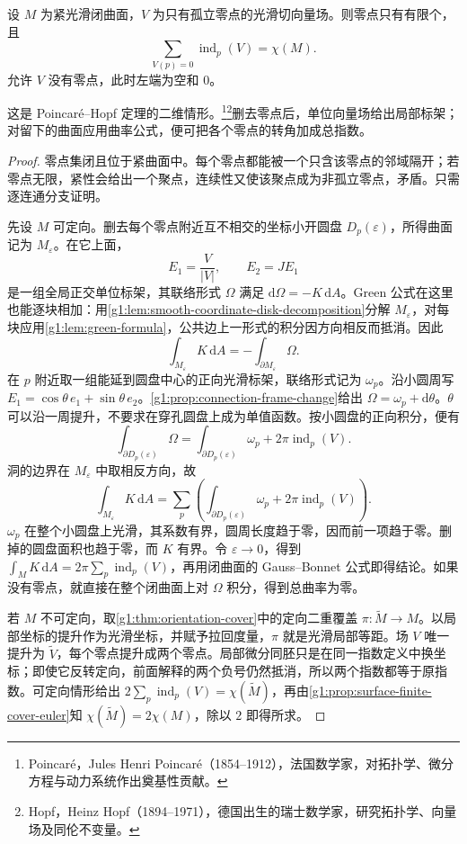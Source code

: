 \begin{theorem}
	\label{g1:thm:surface-poincare-hopf}
	设 \(M\) 为紧光滑闭曲面，\(V\) 为只有孤立零点的光滑切向量场。则零点只有有限个，且
	\begin{equation}
		\label{g1:eq:surface-index-sum}
		\sum_{V(p)=0}\operatorname{ind}_p(V)=\chi(M).
	\end{equation}
	允许 \(V\) 没有零点，此时左端为空和 \(0\)。
\end{theorem}

这是 Poincar\'e--Hopf 定理的二维情形。\footnote{Poincar\'e，Jules Henri Poincar\'e（1854--1912），法国数学家，对拓扑学、微分方程与动力系统作出奠基性贡献。}\footnote{Hopf，Heinz Hopf（1894--1971），德国出生的瑞士数学家，研究拓扑学、向量场及同伦不变量。}删去零点后，单位向量场给出局部标架；对留下的曲面应用曲率公式，便可把各个零点的转角加成总指数。
\begin{proof}
	零点集闭且位于紧曲面中。每个零点都能被一个只含该零点的邻域隔开；若零点无限，紧性会给出一个聚点，连续性又使该聚点成为非孤立零点，矛盾。只需逐连通分支证明。

	先设 \(M\) 可定向。删去每个零点附近互不相交的坐标小开圆盘 \(D_p(\varepsilon)\)，所得曲面记为 \(M_\varepsilon\)。在它上面，
	\[
		E_1=\frac{V}{|V|},\qquad E_2=JE_1
	\]
	是一组全局正交单位标架，其联络形式 \(\Omega\) 满足 \(\mathrm{d}\Omega=-K\,\mathrm{d}A\)。Green 公式在这里也能逐块相加：用\cref{g1:lem:smooth-coordinate-disk-decomposition}分解 \(M_\varepsilon\)，对每块应用\cref{g1:lem:green-formula}，公共边上一形式的积分因方向相反而抵消。因此
	\[
		\int_{M_\varepsilon}K\,\mathrm{d}A=-\int_{\partial M_\varepsilon}\Omega.
	\]
	在 \(p\) 附近取一组能延到圆盘中心的正向光滑标架，联络形式记为 \(\omega_p\)。沿小圆周写 \(E_1=\cos\theta\,e_1+\sin\theta\,e_2\)。\cref{g1:prop:connection-frame-change}给出 \(\Omega=\omega_p+\mathrm{d}\theta\)。\(\theta\) 可以沿一周提升，不要求在穿孔圆盘上成为单值函数。按小圆盘的正向积分，便有
	\[
		\int_{\partial D_p(\varepsilon)}\Omega
		=\int_{\partial D_p(\varepsilon)}\omega_p+2\pi\operatorname{ind}_p(V).
	\]
	洞的边界在 \(M_\varepsilon\) 中取相反方向，故
	\[
		\int_{M_\varepsilon}K\,\mathrm{d}A
		=\sum_p\left(\int_{\partial D_p(\varepsilon)}\omega_p+2\pi\operatorname{ind}_p(V)\right).
	\]
	\(\omega_p\) 在整个小圆盘上光滑，其系数有界，圆周长度趋于零，因而前一项趋于零。删掉的圆盘面积也趋于零，而 \(K\) 有界。令 \(\varepsilon\to0\)，得到 \(\int_M K\,\mathrm{d}A=2\pi\sum_p\operatorname{ind}_p(V)\)，再用闭曲面的 Gauss--Bonnet 公式即得结论。如果没有零点，就直接在整个闭曲面上对 \(\Omega\) 积分，得到总曲率为零。

	若 \(M\) 不可定向，取\cref{g1:thm:orientation-cover}中的定向二重覆盖 \(\pi:\widetilde M\to M\)。以局部坐标的提升作为光滑坐标，并赋予拉回度量，\(\pi\) 就是光滑局部等距。场 \(V\) 唯一提升为 \(\widetilde V\)，每个零点提升成两个零点。局部微分同胚只是在同一指数定义中换坐标；即使它反转定向，前面解释的两个负号仍然抵消，所以两个指数都等于原指数。可定向情形给出 \(2\sum_p\operatorname{ind}_p(V)=\chi(\widetilde M)\)，再由\cref{g1:prop:surface-finite-cover-euler}知 \(\chi(\widetilde M)=2\chi(M)\)，除以 \(2\) 即得所求。
\end{proof}


